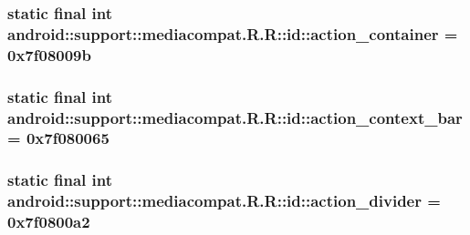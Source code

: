 \hypertarget{classandroid_1_1support_1_1mediacompat_1_1_r_1_1id_fab687462ff73969b6fefe2cd61d1f52}{
\subsubsection[{action\_\-container}]{\setlength{\rightskip}{0pt plus 5cm}static final int android::support::mediacompat.R.R::id::action\_\-container = 0x7f08009b}}
\label{classandroid_1_1support_1_1mediacompat_1_1_r_1_1id_fab687462ff73969b6fefe2cd61d1f52}


\hypertarget{classandroid_1_1support_1_1mediacompat_1_1_r_1_1id_44d9073467a6e20d0393fe1afcc7bf7e}{
\subsubsection[{action\_\-context\_\-bar}]{\setlength{\rightskip}{0pt plus 5cm}static final int android::support::mediacompat.R.R::id::action\_\-context\_\-bar = 0x7f080065}}
\label{classandroid_1_1support_1_1mediacompat_1_1_r_1_1id_44d9073467a6e20d0393fe1afcc7bf7e}


\hypertarget{classandroid_1_1support_1_1mediacompat_1_1_r_1_1id_4873643b7d2f168e6e7d5cd334208eea}{
\subsubsection[{action\_\-divider}]{\setlength{\rightskip}{0pt plus 5cm}static final int android::support::mediacompat.R.R::id::action\_\-divider = 0x7f0800a2}}
\label{classandroid_1_1support_1_1mediacompat_1_1_r_1_1id_4873643b7d2f168e6e7d5cd334208eea}


